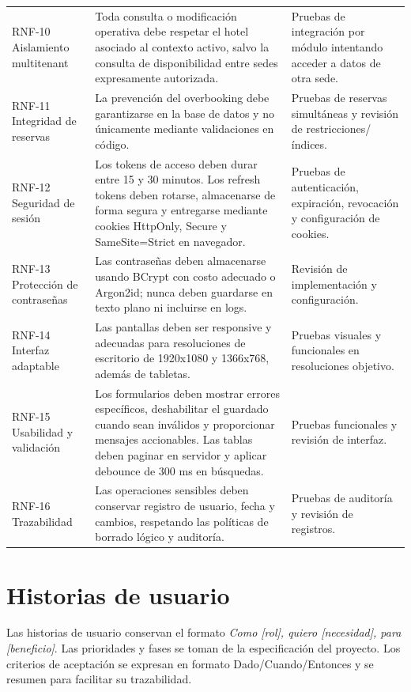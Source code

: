 \documentclass[12pt,a4paper]{article}
\begin{document}
\begin{longtable}{p{2.5cm} p{7.3cm} p{3.6cm}}
RNF-10 Aislamiento multitenant & Toda consulta o modificación operativa debe respetar el hotel asociado al contexto activo, salvo la consulta de disponibilidad entre sedes expresamente autorizada. & Pruebas de integración por módulo intentando acceder a datos de otra sede.\\
RNF-11 Integridad de reservas & La prevención del overbooking debe garantizarse en la base de datos y no únicamente mediante validaciones en código. & Pruebas de reservas simultáneas y revisión de restricciones/índices.\\
RNF-12 Seguridad de sesión & Los tokens de acceso deben durar entre 15 y 30 minutos. Los refresh tokens deben rotarse, almacenarse de forma segura y entregarse mediante cookies HttpOnly, Secure y SameSite=Strict en navegador. & Pruebas de autenticación, expiración, revocación y configuración de cookies.\\
RNF-13 Protección de contraseñas & Las contraseñas deben almacenarse usando BCrypt con costo adecuado o Argon2id; nunca deben guardarse en texto plano ni incluirse en logs. & Revisión de implementación y configuración.\\
RNF-14 Interfaz adaptable & Las pantallas deben ser responsive y adecuadas para resoluciones de escritorio de 1920x1080 y 1366x768, además de tabletas. & Pruebas visuales y funcionales en resoluciones objetivo.\\
RNF-15 Usabilidad y validación & Los formularios deben mostrar errores específicos, deshabilitar el guardado cuando sean inválidos y proporcionar mensajes accionables. Las tablas deben paginar en servidor y aplicar debounce de 300 ms en búsquedas. & Pruebas funcionales y revisión de interfaz.\\
RNF-16 Trazabilidad & Las operaciones sensibles deben conservar registro de usuario, fecha y cambios, respetando las políticas de borrado lógico y auditoría. & Pruebas de auditoría y revisión de registros.\\
\bottomrule
\end{longtable}

\section{Historias de usuario}

Las historias de usuario conservan el formato \textit{Como [rol], quiero [necesidad], para [beneficio]}. Las prioridades y fases se toman de la especificación del proyecto. Los criterios de aceptación se expresan en formato Dado/Cuando/Entonces y se resumen para facilitar su trazabilidad.
\end{document}
